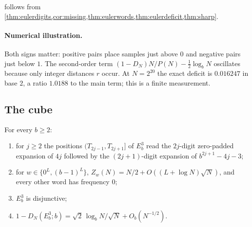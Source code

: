 \documentclass[11pt]{article}
\begin{document}
 follows from
\cref{thm:eulerdigits,cor:missing,thm:eulerwords,thm:eulerdeficit,thm:sharp}.

\paragraph{Numerical illustration.}
Both signs matter: positive pairs place samples just above $0$ and negative pairs just
below $1$. The second-order term $(1-D_N)N/P(N)-\frac12\log_bN$ oscillates because only
integer distances $r$ occur. At $N=2^{20}$ the exact deficit is $0.016247$ in base $2$, a
ratio $1.0188$ to the main term; this is a finite measurement.

\subsection{The cube}\label{subsec:cube}

\begin{theorem}[Cube]\label{thm:cube}
For every $b\ge2$:
\begin{enumerate}[label=\textup{(\alph*)},nosep]
\item for $j\ge2$ the positions $(T_{2j-1},T_{2j+1}]$ of $E_b^3$ read the $2j$-digit
zero-padded expansion of $4j$ followed by the $(2j+1)$-digit expansion of
$b^{2j+1}-4j-3$;
\item for $w\in\{0^L,(b-1)^L\}$, $Z_w(N)=N/2+O((L+\log N)\sqrt N)$, and every other word has
frequency $0$;
\item $E_b^3$ is disjunctive;
\item $1-D_N(E_b^3;b)=\sqrt2\,\log_bN/\sqrt N+O_b(N^{-1/2})$.
\end{enumerate}
\end{theorem}
\end{document}
